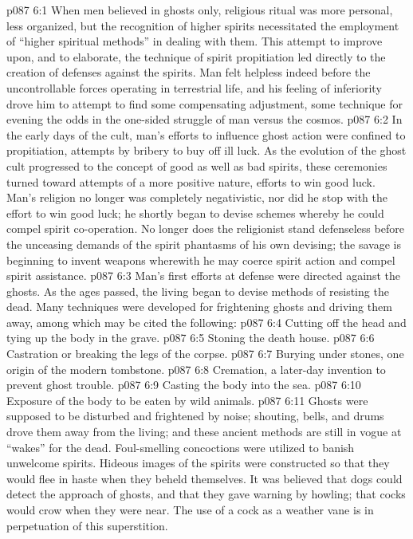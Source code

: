 \vs p087 6:1 When men believed in ghosts only, religious ritual was more personal, less organized, but the recognition of higher spirits necessitated the employment of “higher spiritual methods” in dealing with them. This attempt to improve upon, and to elaborate, the technique of spirit propitiation led directly to the creation of defenses against the spirits. Man felt helpless indeed before the uncontrollable forces operating in terrestrial life, and his feeling of inferiority drove him to attempt to find some compensating adjustment, some technique for evening the odds in the one\hyp{}sided struggle of man versus the cosmos.
\vs p087 6:2 In the early days of the cult, man’s efforts to influence ghost action were confined to propitiation, attempts by bribery to buy off ill luck. As the evolution of the ghost cult progressed to the concept of good as well as bad spirits, these ceremonies turned toward attempts of a more positive nature, efforts to win good luck. Man’s religion no longer was completely negativistic, nor did he stop with the effort to win good luck; he shortly began to devise schemes whereby he could compel spirit co\hyp{}operation. No longer does the religionist stand defenseless before the unceasing demands of the spirit phantasms of his own devising; the savage is beginning to invent weapons wherewith he may coerce spirit action and compel spirit assistance.
\vs p087 6:3 Man’s first efforts at defense were directed against the ghosts. As the ages passed, the living began to devise methods of resisting the dead. Many techniques were developed for frightening ghosts and driving them away, among which may be cited the following:
\pc \vs p087 6:4 \bibnobreakspace Cutting off the head and tying up the body in the grave.
\vs p087 6:5 \bibnobreakspace Stoning the death house.
\vs p087 6:6 \bibnobreakspace Castration or breaking the legs of the corpse.
\vs p087 6:7 \bibnobreakspace Burying under stones, one origin of the modern tombstone.
\vs p087 6:8 \bibnobreakspace Cremation, a later\hyp{}day invention to prevent ghost trouble.
\vs p087 6:9 \bibnobreakspace Casting the body into the sea.
\vs p087 6:10 \bibnobreakspace Exposure of the body to be eaten by wild animals.
\pc \vs p087 6:11 Ghosts were supposed to be disturbed and frightened by noise; shouting, bells, and drums drove them away from the living; and these ancient methods are still in vogue at “wakes” for the dead. Foul\hyp{}smelling concoctions were utilized to banish unwelcome spirits. Hideous images of the spirits were constructed so that they would flee in haste when they beheld themselves. It was believed that dogs could detect the approach of ghosts, and that they gave warning by howling; that cocks would crow when they were near. The use of a cock as a weather vane is in perpetuation of this superstition.
